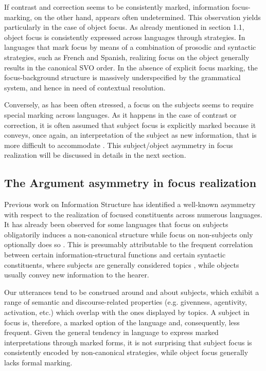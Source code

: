 \documentclass[12pt]{report}
\begin{document}
If contrast and correction seems to be consistently marked, information focus-marking, on the other hand, appears often undetermined. This observation yields particularly in the case of object focus. As already mentioned in section 1.1, object focus is consistently expressed across languages through  strategies. In languages that mark focus by means of a combination of prosodic and syntactic strategies, such as French and Spanish, realizing focus on the object generally results in the canonical SVO order. In the absence of explicit focus marking, the focus-background structure is massively underspecified by the grammatical system, and hence in need of contextual resolution. 

Conversely, as has been often stressed, a focus on the subjects seems to require special marking across languages. As it happens in the case of contrast or correction, it is often assumed that subject focus is explicitly marked because it conveys, once again, an  interpretation of the subject as new information, that is more difficult to accommodate \cite{lambrecht2000subjects}.
This subject/object asymmetry in focus realization will be discussed in details in the next section.



\subsection{The Argument asymmetry in focus realization} \label{asymmetry}

Previous work on Information Structure has identified a well-known asymmetry with respect to the realization of focused constituents across numerous languages. 
It has already been observed for some languages that focus on subjects obligatorily induces a non-canonical structure while focus on non-subjects only optionally does so \cite{skopeteas2010focus}. This is presumably attributable to the frequent correlation between certain information-structural functions and certain syntactic constituents, where subjects are generally considered topics , while objects usually convey new information to the hearer. 

Our utterances tend to be construed around and about subjects, which exhibit a range of semantic and discourse-related properties (e.g. givenness, agentivity, activation, etc.) which overlap with the ones displayed by topics. A subject in focus is, therefore, a marked option of the language and, consequently, less frequent. Given the general tendency in language to express marked interpretations through marked forms, it is not surprising that subject focus is consistently encoded by non-canonical strategies, while object focus generally lacks formal marking.
 
\end{document}
